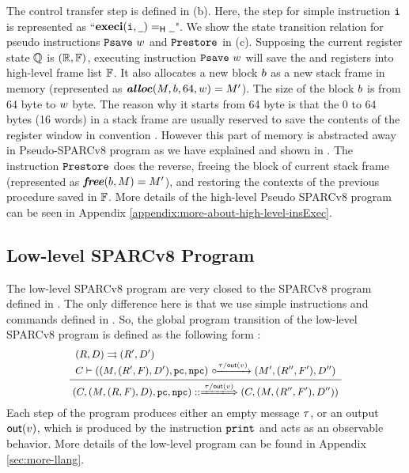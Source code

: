 The control transfer step is defined in  
\Fig{\ref{fig:selected-opsem-high-level-prog}} (b). 
Here, the step for simple instruction $\texttt{i}{}$ is 
represented as ``$\textbf{execi}{{(\texttt{i}{}, \underline{\ \,})}} =_{\textsf{H}} {\underline{\ \,}}$". 
We show the state transition relation for pseudo instructions 
$\texttt{Psave} \ w$ and $\texttt{Prestore}$ in 
\Fig{\ref{fig:selected-opsem-high-level-prog}} (c). 
Supposing the current register state $\mathbb{Q}$ is 
$(\mathbb{R}, \mathbb{F})$, executing instruction
$\texttt{Psave} \ w$ will save the \localRN{} and \inRN{} registers 
into high-level frame list $\mathbb{F}$. It also allocates 
a new block $b$ as a new stack frame in memory 
(represented as $\textbf{\textit{alloc}}(M, b, 64, w) = M'$). 
The size of the block $b$ is from 64 byte to $w$ byte. 
The reason why it starts from 64 byte is that the 0 to 64 bytes 
(16 words) in a stack frame are usually reserved to save 
the contents of the register window in convention \cite{sparc}.  
However this part of memory is abstracted away in 
Pseudo-SPARCv8 program as we have explained and shown in 
\Fig{\ref{fig:Abstraction of Register Windows and Memory}}.
The instruction $\texttt{Prestore}$ does the reverse, 
freeing the block of current stack frame
(represented as $\textbf{\textit{free}}(b, M) = M'$), and 
restoring the contexts of the previous procedure saved in $\mathbb{F}$. 
More details of the high-level Pseudo 
SPARCv8 program can be seen in Appendix \ref{appendix:more-about-high-level-insExec}.

\subsection{Low-level SPARCv8 Program}
\label{subsec:low-level SPARCv8 Program}

The low-level SPARCv8 program are very closed to the SPARCv8 program 
defined in \Fig{\ref{fig:Machine States and Language for SPARC Code}}. 
The only difference here is that we use simple instructions and commands 
defined in \Fig{\ref{fig:syntax-of-concur-pseudo-sparc}}. So, the global 
program transition of the low-level SPARCv8 program is defined as 
the following form : 
\[
    \small
    \infer
    {
        \LGlobTrans{(\code, (\Mem, (\RFile, \Wstack), \DBuf), \pc, \npc)}
            { \empmsg / \outEvt{\val} }
            {(\code, (\Mem, (\RFile'', \Wstack'), \DBuf''))}
    }
    {
        \begin{array}{l}
            \Dstep{(\RFile, \DBuf)}{(\RFile', \DBuf')} \\
            \llocalstep{\code}
                {((\Mem, (\RFile', \Wstack), \DBuf'), \pc, \npc)}
                { \empmsg / \outEvt{\val} }
                {(\Mem', (\RFile'', \Wstack'), \DBuf'')}
        \end{array}
    }
\]
Each step of the program produces either an empty message $\tau$, or  
an output $\textsf{out}({v})$, which is produced by the instruction 
$\texttt{print}$ and acts as an observable behavior. 
More details of the low-level program can be found in Appendix 
\ref{sec:more-llang}. 

